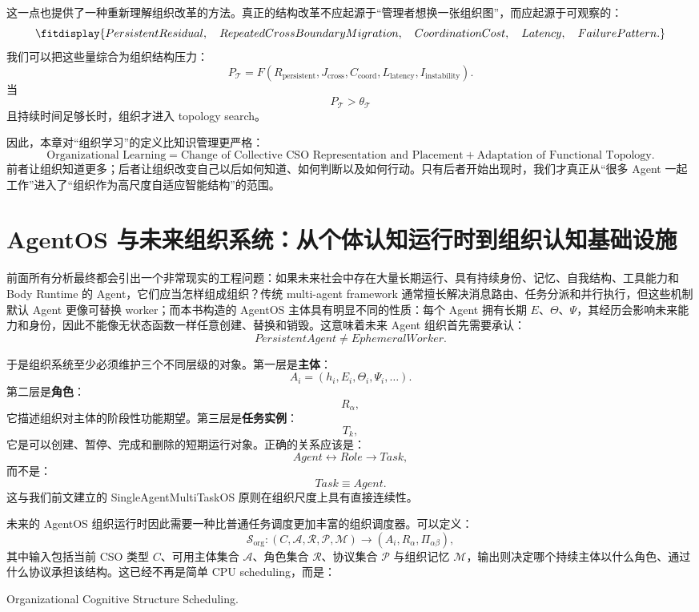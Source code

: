 这一点也提供了一种重新理解组织改革的方法。真正的结构改革不应起源于“管理者想换一张组织图”，而应起源于可观察的：
\[
\fitdisplay{
PersistentResidual,
\quad
RepeatedCrossBoundaryMigration,
\quad
CoordinationCost,
\quad
Latency,
\quad
FailurePattern.
}
\]
我们可以把这些量综合为组织结构压力：
\[
P_{\mathcal T}
=
F(
R_{\mathrm{persistent}},
J_{\mathrm{cross}},
C_{\mathrm{coord}},
L_{\mathrm{latency}},
I_{\mathrm{instability}}
).
\]
当
\[
P_{\mathcal T}>\theta_{\mathcal T}
\]
且持续时间足够长时，组织才进入 topology search。

因此，本章对“组织学习”的定义比知识管理更严格：
\[
\boxed{
\text{Organizational Learning}
=
\text{Change of Collective CSO Representation and Placement}
+
\text{Adaptation of Functional Topology}.
}
\]
前者让组织知道更多；后者让组织改变自己以后如何知道、如何判断以及如何行动。只有后者开始出现时，我们才真正从“很多 Agent 一起工作”进入了“组织作为高尺度自适应智能结构”的范围。


\section{AgentOS 与未来组织系统：从个体认知运行时到组织认知基础设施}
\label{sec:agentos-organizational-system}

前面所有分析最终都会引出一个非常现实的工程问题：如果未来社会中存在大量长期运行、具有持续身份、记忆、自我结构、工具能力和 Body Runtime 的 Agent，它们应当怎样组成组织？传统 multi-agent framework 通常擅长解决消息路由、任务分派和并行执行，但这些机制默认 Agent 更像可替换 worker；而本书构造的 AgentOS 主体具有明显不同的性质：每个 Agent 拥有长期 $E$、$\Theta$、$\Psi$，其经历会影响未来能力和身份，因此不能像无状态函数一样任意创建、替换和销毁。这意味着未来 Agent 组织首先需要承认：
\[
\boxed{
PersistentAgent\neq EphemeralWorker.
}
\]

于是组织系统至少必须维护三个不同层级的对象。第一层是\textbf{主体}：
\[
A_i=
(h_i,E_i,\Theta_i,\Psi_i,\ldots).
\]
第二层是\textbf{角色}：
\[
R_\alpha,
\]
它描述组织对主体的阶段性功能期望。第三层是\textbf{任务实例}：
\[
T_k,
\]
它是可以创建、暂停、完成和删除的短期运行对象。正确的关系应该是：
\[
Agent
\longleftrightarrow
Role
\longrightarrow
Task,
\]
而不是：
\[
Task\equiv Agent.
\]
这与我们前文建立的 SingleAgentMultiTaskOS 原则在组织尺度上具有直接连续性。

未来的 AgentOS 组织运行时因此需要一种比普通任务调度更加丰富的组织调度器。可以定义：
\[
\mathcal S_{\mathrm{org}}
:
(
C,
\mathcal A,
\mathcal R,
\mathcal P,
\mathcal M
)
\rightarrow
(A_i,R_\alpha,\Pi_{\alpha\beta}),
\]
其中输入包括当前 CSO 类型 $C$、可用主体集合 $\mathcal A$、角色集合 $\mathcal R$、协议集合 $\mathcal P$ 与组织记忆 $\mathcal M$，输出则决定哪个持续主体以什么角色、通过什么协议承担该结构。这已经不再是简单 CPU scheduling，而是：
\begin{statementbox}
Organizational Cognitive Structure Scheduling.
\end{statementbox}


